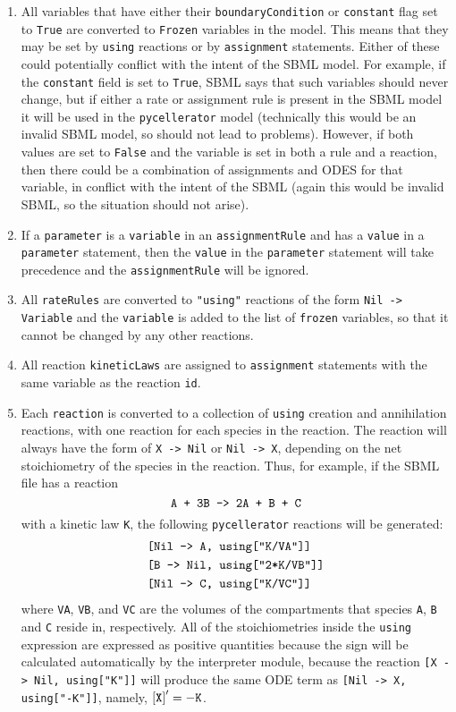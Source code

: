 \begin{enumerate}
\item All variables that have either their {\tt boundaryCondition} or {\tt constant} flag set to {\tt True} are converted to {\tt Frozen} variables in the model. This means that they may be set by {\tt using} reactions or by {\tt assignment} statements. Either of these could potentially conflict with the intent of the SBML model. For example, if the {\tt constant} field is set to {\tt True}, SBML says that such variables should never change, but if either a rate or assignment rule is present in the SBML model it will be used in the {\tt pycellerator} model (technically this would be an invalid SBML model, so should  not lead to problems). However, if both values are set to {\tt False} and the variable is set in both a rule and a reaction, then there could be a combination of assignments and ODES for that variable, in conflict with the intent of the SBML (again this would be invalid SBML, so the situation should not arise). 
\item If a {\tt parameter} is a {\tt variable} in an {\tt assignmentRule} and has a {\tt value} in a {\tt parameter} statement, then the {\tt value} in the {\tt parameter} statement will take precedence and the {\tt assignmentRule} will be ignored. 
\item All {\tt rateRules} are converted to {\tt "using"} reactions of the form {\tt Nil -> Variable} and the {\tt variable} is added to the list of {\tt frozen} variables, so that it cannot be changed by any other reactions. 
\item All reaction {\tt kineticLaws} are assigned to {\tt assignment} statements with the same variable as the reaction {\tt id}. 
\item Each {\tt reaction} is converted to a collection of {\tt using} creation and annihilation reactions, with one reaction for each species in the reaction. The reaction will always have the form of {\tt X -> Nil} or {\tt Nil -> X}, depending on the net stoichiometry of the species in the reaction. Thus, for example, if the SBML file has a reaction 
$$\text{\tt{A + 3B -> 2A + B + C}}$$ 
with a kinetic law {\tt K}, 
the following {\tt pycellerator} reactions will be generated:
\begin{align*}
&\text{\tt{[Nil -> A, using["K/VA"]]}}\\
&\text{\tt{[B -> Nil, using["2*K/VB"]]}}\\
&\text{\tt{[Nil -> C, using["K/VC"]]}}
\end{align*}
where {\tt VA}, {\tt VB}, and {\tt VC} are the volumes of the compartments that species {\tt A}, {\tt B} and {\tt C} reside in, respectively. All of the stoichiometries inside the {\tt using} expression are expressed as positive quantities because the sign will be calculated automatically by the interpreter module, because the reaction {\tt [X -> Nil, using["K"]]} will produce the same ODE term as {\tt [Nil -> X, using["-K"]]}, namely, ${\tt[X]}'=-{\tt K}$.


\end{enumerate}
